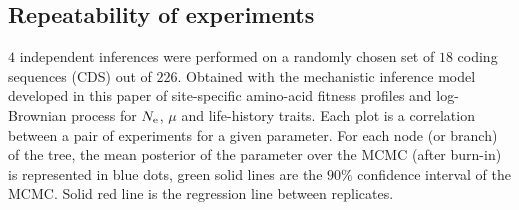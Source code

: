 \documentclass{article}
\begin{document}
	\subsection{Repeatability of experiments}
	\label{subsec:repeatability-of-experiments-mammals}

	$4$ independent inferences were performed on a randomly chosen set of $18$ coding sequences ({CDS}) out of $226$.
	Obtained with the mechanistic inference model developed in this paper of site-specific amino-acid fitness profiles and log-Brownian process for $N_{\text{e}}$, $\mu$ and life-history traits.
	Each plot is a correlation between a pair of experiments for a given parameter.
	For each node (or branch) of the tree, the mean {posterior} of the parameter over the {MCMC} (after burn-in) is represented in blue dots, green solid lines are the $90\%$ confidence interval of the {MCMC}.
	Solid red line is the regression line between replicates.
\end{document}
